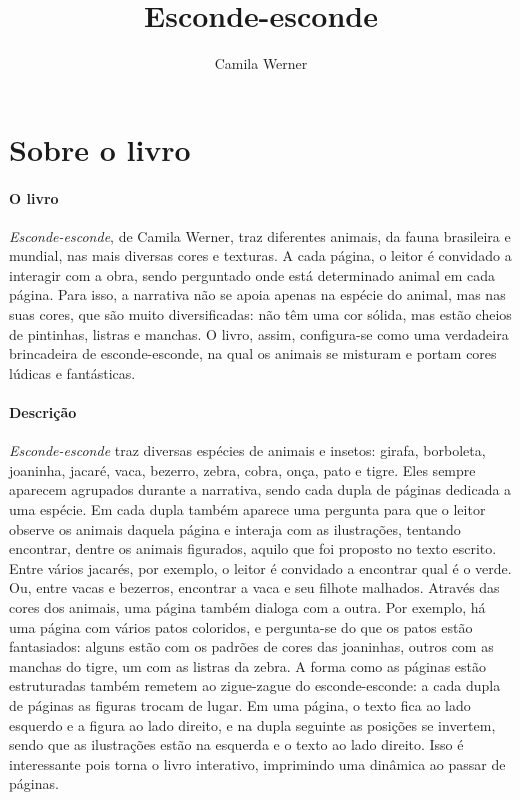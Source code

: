 \documentclass[11pt]{extarticle}
\newcommand{\AutorLivro}{Camila Werner}
\newcommand{\TituloLivro}{Esconde-esconde}
\begin{document}
\title{\TituloLivro}
\author{\AutorLivro}
\def\authornotes{\colaborador}

\date{}
\maketitle


\tableofcontents



\section{Sobre o livro}

\paragraph{O livro} \textit{Esconde-esconde}, de Camila Werner, traz diferentes animais, da fauna brasileira e mundial, nas mais diversas cores e texturas. A cada página, o leitor é convidado a interagir com a obra, sendo perguntado onde está determinado animal em cada página. Para isso, a narrativa não se apoia apenas na espécie do animal, mas nas suas cores, que são muito diversificadas: não têm uma cor sólida, mas estão cheios de pintinhas, listras e manchas. O livro, assim, configura-se como uma verdadeira brincadeira de esconde-esconde, na qual os animais se misturam e portam cores lúdicas e fantásticas.

\paragraph{Descrição} \textit{Esconde-esconde} traz diversas espécies de animais e insetos: girafa, borboleta, joaninha, jacaré, vaca, bezerro, zebra, cobra, onça, pato e tigre. Eles sempre aparecem agrupados durante a narrativa, sendo cada dupla de páginas dedicada a uma espécie. Em cada dupla também aparece uma pergunta para que o leitor observe os animais daquela página e interaja com as ilustrações, tentando encontrar, dentre os animais figurados, aquilo que foi proposto no texto escrito. Entre vários jacarés, por exemplo, o leitor é convidado a encontrar qual é o verde. Ou, entre vacas e bezerros, encontrar a vaca e seu filhote malhados. Através das cores dos animais, uma página também dialoga com a outra. Por exemplo, há uma página com vários patos coloridos, e pergunta-se do que os patos estão fantasiados: alguns estão com os padrões de cores das joaninhas, outros com as manchas do tigre, um com as listras da zebra. A forma como as páginas estão estruturadas também remetem ao zigue-zague do esconde-esconde: a cada dupla de páginas as figuras trocam de lugar. Em uma página, o texto fica ao lado esquerdo e a figura ao lado direito, e na dupla seguinte as posições se invertem, sendo que as ilustrações estão na esquerda e o texto ao lado direito. Isso é interessante pois torna o livro interativo, imprimindo uma dinâmica ao passar de páginas.
\end{document}
